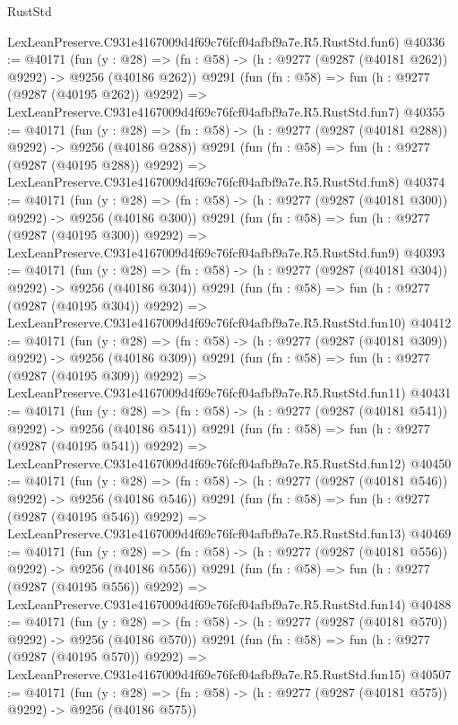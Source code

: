 \begin{lexlean}{RustStd}
\begin{coremodule}
    LexLeanPreserve.C931e4167009d4f69c76fcf04afbf9a7e.R5.RustStd.fun6)
@40336 := @40171
    (fun (y : @28) => (fn : @58) -> (h : @9277 (@9287 (@40181 @262)) @9292) -> @9256 (@40186 @262))
    @9291
    (fun (fn : @58) =>
    fun (h : @9277 (@9287 (@40195 @262)) @9292) =>
    LexLeanPreserve.C931e4167009d4f69c76fcf04afbf9a7e.R5.RustStd.fun7)
@40355 := @40171
    (fun (y : @28) => (fn : @58) -> (h : @9277 (@9287 (@40181 @288)) @9292) -> @9256 (@40186 @288))
    @9291
    (fun (fn : @58) =>
    fun (h : @9277 (@9287 (@40195 @288)) @9292) =>
    LexLeanPreserve.C931e4167009d4f69c76fcf04afbf9a7e.R5.RustStd.fun8)
@40374 := @40171
    (fun (y : @28) => (fn : @58) -> (h : @9277 (@9287 (@40181 @300)) @9292) -> @9256 (@40186 @300))
    @9291
    (fun (fn : @58) =>
    fun (h : @9277 (@9287 (@40195 @300)) @9292) =>
    LexLeanPreserve.C931e4167009d4f69c76fcf04afbf9a7e.R5.RustStd.fun9)
@40393 := @40171
    (fun (y : @28) => (fn : @58) -> (h : @9277 (@9287 (@40181 @304)) @9292) -> @9256 (@40186 @304))
    @9291
    (fun (fn : @58) =>
    fun (h : @9277 (@9287 (@40195 @304)) @9292) =>
    LexLeanPreserve.C931e4167009d4f69c76fcf04afbf9a7e.R5.RustStd.fun10)
@40412 := @40171
    (fun (y : @28) => (fn : @58) -> (h : @9277 (@9287 (@40181 @309)) @9292) -> @9256 (@40186 @309))
    @9291
    (fun (fn : @58) =>
    fun (h : @9277 (@9287 (@40195 @309)) @9292) =>
    LexLeanPreserve.C931e4167009d4f69c76fcf04afbf9a7e.R5.RustStd.fun11)
@40431 := @40171
    (fun (y : @28) => (fn : @58) -> (h : @9277 (@9287 (@40181 @541)) @9292) -> @9256 (@40186 @541))
    @9291
    (fun (fn : @58) =>
    fun (h : @9277 (@9287 (@40195 @541)) @9292) =>
    LexLeanPreserve.C931e4167009d4f69c76fcf04afbf9a7e.R5.RustStd.fun12)
@40450 := @40171
    (fun (y : @28) => (fn : @58) -> (h : @9277 (@9287 (@40181 @546)) @9292) -> @9256 (@40186 @546))
    @9291
    (fun (fn : @58) =>
    fun (h : @9277 (@9287 (@40195 @546)) @9292) =>
    LexLeanPreserve.C931e4167009d4f69c76fcf04afbf9a7e.R5.RustStd.fun13)
@40469 := @40171
    (fun (y : @28) => (fn : @58) -> (h : @9277 (@9287 (@40181 @556)) @9292) -> @9256 (@40186 @556))
    @9291
    (fun (fn : @58) =>
    fun (h : @9277 (@9287 (@40195 @556)) @9292) =>
    LexLeanPreserve.C931e4167009d4f69c76fcf04afbf9a7e.R5.RustStd.fun14)
@40488 := @40171
    (fun (y : @28) => (fn : @58) -> (h : @9277 (@9287 (@40181 @570)) @9292) -> @9256 (@40186 @570))
    @9291
    (fun (fn : @58) =>
    fun (h : @9277 (@9287 (@40195 @570)) @9292) =>
    LexLeanPreserve.C931e4167009d4f69c76fcf04afbf9a7e.R5.RustStd.fun15)
@40507 := @40171
    (fun (y : @28) => (fn : @58) -> (h : @9277 (@9287 (@40181 @575)) @9292) -> @9256 (@40186 @575))

\end{coremodule}
\end{lexlean}
